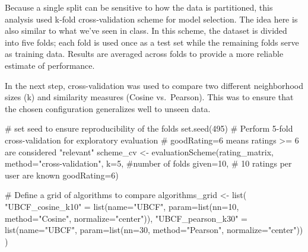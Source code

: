 \documentclass[
  12pt]{article}
\newenvironment{Shaded}{\begin{snugshade}}{\end{snugshade}}
\newcommand{\AttributeTok}[1]{\textcolor[rgb]{0.40,0.45,0.13}{#1}}
\newcommand{\CommentTok}[1]{\textcolor[rgb]{0.37,0.37,0.37}{#1}}
\newcommand{\DecValTok}[1]{\textcolor[rgb]{0.68,0.00,0.00}{#1}}
\newcommand{\FunctionTok}[1]{\textcolor[rgb]{0.28,0.35,0.67}{#1}}
\newcommand{\NormalTok}[1]{\textcolor[rgb]{0.00,0.23,0.31}{#1}}
\newcommand{\OtherTok}[1]{\textcolor[rgb]{0.00,0.23,0.31}{#1}}
\newcommand{\StringTok}[1]{\textcolor[rgb]{0.13,0.47,0.30}{#1}}
\begin{document}
Because a single split can be sensitive to how the data is partitioned,
this analysis used k‑fold cross‑validation scheme for model selection.
The idea here is also similar to what we've seen in class. In this
scheme, the dataset is divided into five folds; each fold is used once
as a test set while the remaining folds serve as training data. Results
are averaged across folds to provide a more reliable estimate of
performance.

In the next step, cross-validation was used to compare two different
neighborhood sizes (k) and similarity measures (Cosine vs.~Pearson).
This was to ensure that the chosen configuration generalizes well to
unseen data.

\begin{Shaded}
\begin{Highlighting}[]
\CommentTok{\# set seed  to ensure reproducibility of the folds}
\FunctionTok{set.seed}\NormalTok{(}\DecValTok{495}\NormalTok{)}
\CommentTok{\# Perform 5{-}fold cross{-}validation for exploratory evaluation}
\CommentTok{\# goodRating=6 means ratings \textgreater{}= 6 are considered "relevant"}
\NormalTok{scheme\_cv }\OtherTok{\textless{}{-}} \FunctionTok{evaluationScheme}\NormalTok{(rating\_matrix, }
                              \AttributeTok{method=}\StringTok{"cross{-}validation"}\NormalTok{,}
                              \AttributeTok{k=}\DecValTok{5}\NormalTok{,  }\CommentTok{\#number of folds }
                              \AttributeTok{given=}\DecValTok{10}\NormalTok{, }\CommentTok{\# 10 ratings per user are known}
                              \AttributeTok{goodRating=}\DecValTok{6}\NormalTok{) }

\CommentTok{\# Define a grid of algorithms to compare}
\NormalTok{algorithms\_grid }\OtherTok{\textless{}{-}} \FunctionTok{list}\NormalTok{(}
  \StringTok{"UBCF\_cosine\_k10"} \OtherTok{=} \FunctionTok{list}\NormalTok{(}\AttributeTok{name=}\StringTok{"UBCF"}\NormalTok{, }
                           \AttributeTok{param=}\FunctionTok{list}\NormalTok{(}\AttributeTok{nn=}\DecValTok{10}\NormalTok{, }
                                      \AttributeTok{method=}\StringTok{"Cosine"}\NormalTok{, }
                                      \AttributeTok{normalize=}\StringTok{"center"}\NormalTok{)),}
  \StringTok{"UBCF\_pearson\_k30"} \OtherTok{=} \FunctionTok{list}\NormalTok{(}\AttributeTok{name=}\StringTok{"UBCF"}\NormalTok{, }
                            \AttributeTok{param=}\FunctionTok{list}\NormalTok{(}\AttributeTok{nn=}\DecValTok{30}\NormalTok{, }
                                       \AttributeTok{method=}\StringTok{"Pearson"}\NormalTok{, }
                                       \AttributeTok{normalize=}\StringTok{"center"}\NormalTok{))}
\NormalTok{)}


\end{Highlighting}
\end{Shaded}
\end{document}
